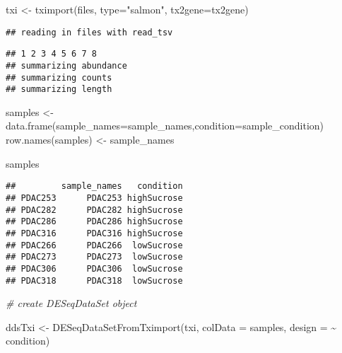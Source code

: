 \documentclass[
]{article}
\newenvironment{Shaded}{\begin{snugshade}}{\end{snugshade}}
\newcommand{\AttributeTok}[1]{\textcolor[rgb]{0.77,0.63,0.00}{#1}}
\newcommand{\CommentTok}[1]{\textcolor[rgb]{0.56,0.35,0.01}{\textit{#1}}}
\newcommand{\FunctionTok}[1]{\textcolor[rgb]{0.00,0.00,0.00}{#1}}
\newcommand{\NormalTok}[1]{#1}
\newcommand{\OtherTok}[1]{\textcolor[rgb]{0.56,0.35,0.01}{#1}}
\newcommand{\SpecialCharTok}[1]{\textcolor[rgb]{0.00,0.00,0.00}{#1}}
\newcommand{\StringTok}[1]{\textcolor[rgb]{0.31,0.60,0.02}{#1}}
\begin{document}
\begin{Shaded}
\begin{Highlighting}[]
\NormalTok{txi }\OtherTok{\textless{}{-}} \FunctionTok{tximport}\NormalTok{(files, }\AttributeTok{type=}\StringTok{"salmon"}\NormalTok{, }\AttributeTok{tx2gene=}\NormalTok{tx2gene)}
\end{Highlighting}
\end{Shaded}

\begin{verbatim}
## reading in files with read_tsv
\end{verbatim}

\begin{verbatim}
## 1 2 3 4 5 6 7 8 
## summarizing abundance
## summarizing counts
## summarizing length
\end{verbatim}

\begin{Shaded}
\begin{Highlighting}[]
\NormalTok{samples }\OtherTok{\textless{}{-}} \FunctionTok{data.frame}\NormalTok{(}\AttributeTok{sample\_names=}\NormalTok{sample\_names,}\AttributeTok{condition=}\NormalTok{sample\_condition)}
\FunctionTok{row.names}\NormalTok{(samples) }\OtherTok{\textless{}{-}}\NormalTok{ sample\_names}
\end{Highlighting}
\end{Shaded}

\begin{Shaded}
\begin{Highlighting}[]
\NormalTok{samples}
\end{Highlighting}
\end{Shaded}

\begin{verbatim}
##         sample_names   condition
## PDAC253      PDAC253 highSucrose
## PDAC282      PDAC282 highSucrose
## PDAC286      PDAC286 highSucrose
## PDAC316      PDAC316 highSucrose
## PDAC266      PDAC266  lowSucrose
## PDAC273      PDAC273  lowSucrose
## PDAC306      PDAC306  lowSucrose
## PDAC318      PDAC318  lowSucrose
\end{verbatim}

\begin{Shaded}
\begin{Highlighting}[]
\CommentTok{\# create DESeqDataSet object}

\NormalTok{ddsTxi }\OtherTok{\textless{}{-}} \FunctionTok{DESeqDataSetFromTximport}\NormalTok{(txi,}
                                   \AttributeTok{colData =}\NormalTok{ samples,}
                                   \AttributeTok{design =} \SpecialCharTok{\textasciitilde{}}\NormalTok{ condition)}
\end{Highlighting}
\end{Shaded}
\end{document}
